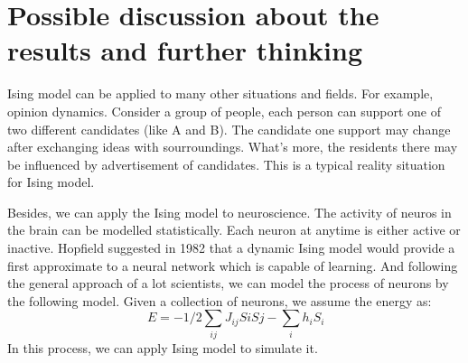 \documentclass[11pt,openany]{book}              %
\begin{document}
\section{ Possible discussion about the results and further thinking }
Ising model can be applied to many other situations and fields. For example, opinion dynamics.
Consider a group of people, each person can support one of two different candidates (like A and B).
The candidate one support may change after exchanging ideas with sourroundings.
What's more, the residents there may be influenced by advertisement of candidates. This is a typical
reality situation for Ising model.

Besides, we can apply the Ising model to neuroscience. The activity of neuros in the brain can be
modelled statistically. Each neuron at anytime is either active or inactive. Hopfield suggested in 1982
that a dynamic Ising model would provide a first approximate to a neural network which is capable of learning.
And following the general approach of a lot scientists, we can model the process of neurons by the following
model. Given a collection of neurons, we assume the energy as:
\begin{equation}
	\, E = -1/2 \sum_{ij}J_{ij}SiSj-\sum_i h_iS_i
\end{equation}
In this process, we can apply Ising model to simulate it.
%
%
\end{document}
